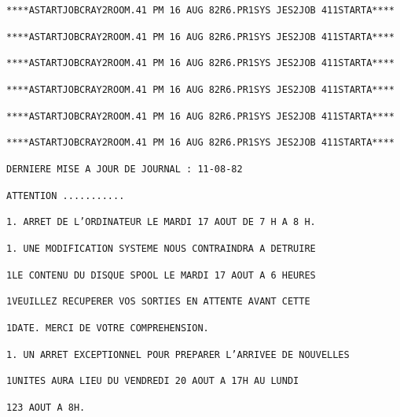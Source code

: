 \texttt{****A\quad START\quad JOB\quad CRAY2\qquad ROOM.41 PM 16 AUG 82\quad R6.PR1\quad SYS JES2\quad JOB 411\quad START\quad A****}\par
\texttt{****A\quad START\quad JOB\quad CRAY2\qquad ROOM.41 PM 16 AUG 82\quad R6.PR1\quad SYS JES2\quad JOB 411\quad START\quad A****}\par
\texttt{****A\quad START\quad JOB\quad CRAY2\qquad ROOM.41 PM 16 AUG 82\quad R6.PR1\quad SYS JES2\quad JOB 411\quad START\quad A****}\par
\texttt{****A\quad START\quad JOB\quad CRAY2\qquad ROOM.41 PM 16 AUG 82\quad R6.PR1\quad SYS JES2\quad JOB 411\quad START\quad A****}\par
\texttt{****A\quad START\quad JOB\quad CRAY2\qquad ROOM.41 PM 16 AUG 82\quad R6.PR1\quad SYS JES2\quad JOB 411\quad START\quad A****}\par
\texttt{****A\quad START\quad JOB\quad CRAY2\qquad ROOM.41 PM 16 AUG 82\quad R6.PR1\quad SYS JES2\quad JOB 411\quad START\quad A****}

\texttt{DERNIERE MISE A JOUR DE JOURNAL : 11-08-82}\par
\texttt{ATTENTION ...........}

\texttt{1. ARRET DE L'ORDINATEUR LE MARDI 17 AOUT DE 7 H A 8 H.}

\texttt{1. UNE MODIFICATION SYSTEME NOUS CONTRAINDRA A DETRUIRE}\par
\texttt{1\qquad\phantom{2. }LE CONTENU DU DISQUE SPOOL LE MARDI 17 AOUT A 6 HEURES}\par
\texttt{1\qquad\phantom{2. }VEUILLEZ RECUPERER VOS SORTIES EN ATTENTE AVANT CETTE}\par
\texttt{1\qquad\phantom{2. }DATE. MERCI DE VOTRE COMPREHENSION.}

\texttt{1. UN ARRET EXCEPTIONNEL POUR PREPARER L'ARRIVEE DE NOUVELLES}\par
\texttt{1\qquad\phantom{3. }UNITES AURA LIEU DU VENDREDI 20 AOUT A 17H  AU LUNDI}\par
\texttt{1\qquad\phantom{3. }23 AOUT A 8H.}

